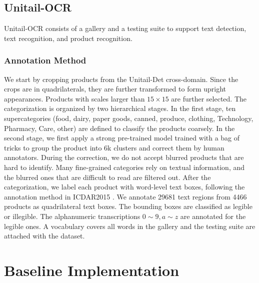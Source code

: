 \documentclass[runningheads]{llncs}
\begin{document}
\subsection{Unitail-OCR}
Unitail-OCR consists of a gallery and a testing suite to support text detection, text recognition, and product recognition.
\subsubsection{Annotation Method}
We start by cropping products from the Unitail-Det cross-domain. Since the crops are in quadrilaterals, they are further transformed to form upright appearances. Products with scales larger than $15 \times 15$ are further selected. The categorization is organized by two hierarchical stages. In the first stage, ten supercategories (food, dairy, paper goods, canned, produce, clothing, Technology, Pharmacy, Care, other) are defined to classify the products coarsely. In the second stage, we first apply a strong pre-trained model trained with a bag of tricks to group the product into 6k clusters and correct them by human annotators. During the correction, we do not accept blurred products that are hard to identify. Many fine-grained categories rely on textual information, and the blurred ones that 
are difficult to read are filtered out. After the categorization, we label each product with word-level text boxes, following the annotation method in ICDAR2015 \cite{ICDAR15}. We annotate 29681 text regions from 4466 products as quadrilateral text boxes. The bounding boxes are classified as legible or illegible. The alphanumeric transcriptions $0\sim 9, a\sim z$ are annotated for the legible ones. A vocabulary covers all words in the gallery and the testing suite are attached with the dataset.

\section{Baseline Implementation}
\end{document}
